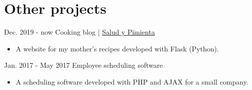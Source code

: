 \documentclass[]{commands}
\begin{document}
\section{Other projects}
\begin{entrylist}
 
   \entry
    {Dec. 2019 - now}
    {Cooking blog | }
    {\href{https://www.saludypimienta.com/}{\small Salud y Pimienta \faMousePointer}}
    {}
    {\jobspace
    \begin{itemize}[leftmargin=*, itemsep = 0.1em]
        \item A website for my mother's recipes developed with Flask (Python).\\
    \end{itemize}}
    
   \entry
    {Jan. 2017 - May 2017}
    {Employee scheduling software}
    {}
    {}
    {\jobspace
    \begin{itemize}[leftmargin=*, itemsep = 0.1em]
        \item A scheduling software developed with PHP and AJAX for a small company.\\
    \end{itemize}}
    \vspace{-4mm}
\end{entrylist}
\let\clearpage\relax
\end{document}
